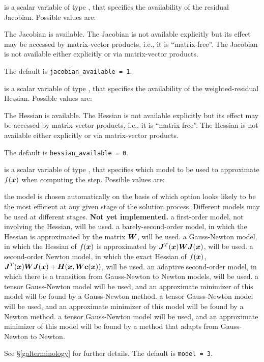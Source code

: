 \documentclass{galahad}
\begin{document}
\begin{description}
 is a scalar variable of type \integer,
that specifies the availability of the residual Jacobian.
Possible values are:

\begin{description}
 The Jacobian is available.
 The Jacobian is not available explicitly but its effect
may be accessed by matrix-vector products, i.e., it is ``matrix-free''.
 The Jacobian is not available either explicitly or via
matrix-vector products.
\end{description}
The default is {\tt jacobian\_available = 1}.

 is a scalar variable of type \integer,
that specifies the availability of the weighted-residual Hessian.
Possible values are:

\begin{description}
 The Hessian is available.
 The Hessian is not available explicitly but its effect
may be accessed by matrix-vector products, i.e., it is ``matrix-free''.
 The Hessian is not available either explicitly or via
matrix-vector products.
\end{description}
The default is {\tt hessian\_available = 0}.

 is a scalar variable of type \integer, that specifies
which model to be used to approximate $f({\bm{x}})$ when computing the step.
Possible values are:

\begin{description}
 the model is chosen automatically on the basis of which option
        looks likely to be the most efficient at any given stage of the
        solution process. Different models may be used at different stages.
        {\bf Not yet implemented.}
 a first-order model, not involving the Hessian, will be used.
 a barely-second-order model, in which the Hessian is approximated
        by the matrix ${\bm{W}}$, will be used.
 a Gauss-Newton model, in which the Hessian of $f({\bm{x}})$
        is approximated by ${\bm{J}}^T({\bm{x}}) {\bm{W}} {\bm{J}}({\bm{x}})$, will be used.
 a second-order Newton model, in which the exact Hessian of $f({\bm{x}})$,
${\bm{J}}^T({\bm{x}}) {\bm{W}} {\bm{J}}({\bm{x}}) + {\bm{H}}({\bm{x}},{\bm{W}} {\bm{c}}({\bm{x}}))$,
will be used.
 an adaptive second-order model, in which there is a transition from
         Gauss-Newton to Newton models, will be used.
 a tensor Gauss-Newton model will be used, and an approximate minimizer
of this model will be found by a Gauss-Newton method.
 a tensor Gauss-Newton model will be used, and an approximate minimizer
of this model will be found by a Newton method.
 a tensor Gauss-Newton model will be used, and an approximate
 minimizer
of this model will be found by a method that adapts from Gauss-Newton to Newton.
\end{description}
See \S\ref{galterminology} for further details.
The default is {\tt model = 3}.


\end{description}
\end{document}
